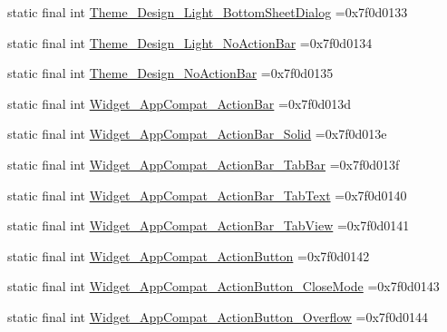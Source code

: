 \begin{DoxyCompactItemize}
\item 
static final int \mbox{\hyperlink{classbr_1_1unb_1_1cic_1_1mp_1_1marketmaster_1_1R_1_1style_adb40c1665434ffa86550b76f06c5fb00}{Theme\+\_\+\+Design\+\_\+\+Light\+\_\+\+Bottom\+Sheet\+Dialog}} =0x7f0d0133
\item 
static final int \mbox{\hyperlink{classbr_1_1unb_1_1cic_1_1mp_1_1marketmaster_1_1R_1_1style_a002939d109a8402c801ad9d15941419f}{Theme\+\_\+\+Design\+\_\+\+Light\+\_\+\+No\+Action\+Bar}} =0x7f0d0134
\item 
static final int \mbox{\hyperlink{classbr_1_1unb_1_1cic_1_1mp_1_1marketmaster_1_1R_1_1style_a072174be35ecc8980c6d6e19a34e14ef}{Theme\+\_\+\+Design\+\_\+\+No\+Action\+Bar}} =0x7f0d0135
\item 
static final int \mbox{\hyperlink{classbr_1_1unb_1_1cic_1_1mp_1_1marketmaster_1_1R_1_1style_a36877505eda7e1e2c3706e9a8e647d3c}{Widget\+\_\+\+App\+Compat\+\_\+\+Action\+Bar}} =0x7f0d013d
\item 
static final int \mbox{\hyperlink{classbr_1_1unb_1_1cic_1_1mp_1_1marketmaster_1_1R_1_1style_af5a252abca8b7bbe98d92db00b55b313}{Widget\+\_\+\+App\+Compat\+\_\+\+Action\+Bar\+\_\+\+Solid}} =0x7f0d013e
\item 
static final int \mbox{\hyperlink{classbr_1_1unb_1_1cic_1_1mp_1_1marketmaster_1_1R_1_1style_ac6fa1e4850ad5a7b0e960f84d2fc6b95}{Widget\+\_\+\+App\+Compat\+\_\+\+Action\+Bar\+\_\+\+Tab\+Bar}} =0x7f0d013f
\item 
static final int \mbox{\hyperlink{classbr_1_1unb_1_1cic_1_1mp_1_1marketmaster_1_1R_1_1style_aa4558e30074d9c6894850bb1a3d8fe11}{Widget\+\_\+\+App\+Compat\+\_\+\+Action\+Bar\+\_\+\+Tab\+Text}} =0x7f0d0140
\item 
static final int \mbox{\hyperlink{classbr_1_1unb_1_1cic_1_1mp_1_1marketmaster_1_1R_1_1style_a865da2837484db97f002c47b7c38e3bc}{Widget\+\_\+\+App\+Compat\+\_\+\+Action\+Bar\+\_\+\+Tab\+View}} =0x7f0d0141
\item 
static final int \mbox{\hyperlink{classbr_1_1unb_1_1cic_1_1mp_1_1marketmaster_1_1R_1_1style_acdbe5c74ea68706353ec1d7093c8d3e6}{Widget\+\_\+\+App\+Compat\+\_\+\+Action\+Button}} =0x7f0d0142
\item 
static final int \mbox{\hyperlink{classbr_1_1unb_1_1cic_1_1mp_1_1marketmaster_1_1R_1_1style_a3d5abfcd5f9f8a364480d95eb469fcd6}{Widget\+\_\+\+App\+Compat\+\_\+\+Action\+Button\+\_\+\+Close\+Mode}} =0x7f0d0143
\item 
static final int \mbox{\hyperlink{classbr_1_1unb_1_1cic_1_1mp_1_1marketmaster_1_1R_1_1style_a91f100ccf430601cd844e6890060fbab}{Widget\+\_\+\+App\+Compat\+\_\+\+Action\+Button\+\_\+\+Overflow}} =0x7f0d0144

\end{DoxyCompactItemize}
